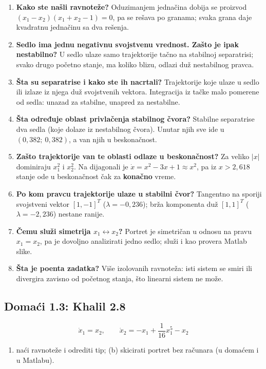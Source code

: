 \documentclass[11pt,a4paper,parskip=half,headsepline,numbers=noenddot]{scrartcl}
\begin{document}
\begin{enumerate}
\def\labelenumi{\arabic{enumi}.}
\item \textbf{Kako ste našli ravnoteže?} Oduzimanjem jednačina dobija se proizvod \((x_1 - x_2)(x_1 + x_2 - 1) = 0\), pa se rešava po granama; svaka grana daje kvadratnu jednačinu sa dva rešenja.
\item \textbf{Sedlo ima jednu negativnu svojstvenu vrednost. Zašto je ipak nestabilno?} U sedlo ulaze samo trajektorije tačno na stabilnoj separatrisi; svako drugo početno stanje, ma koliko blizu, odlazi duž nestabilnog pravca.
\item \textbf{Šta su separatrise i kako ste ih nacrtali?} Trajektorije koje ulaze u sedlo ili izlaze iz njega duž svojstvenih vektora. Integracija iz tačke malo pomerene od sedla: unazad za stabilne, unapred za nestabilne.
\item \textbf{Šta određuje oblast privlačenja stabilnog čvora?} Stabilne separatrise dva sedla (koje dolaze iz nestabilnog čvora). Unutar njih sve ide u \((0{,}382;\ 0{,}382)\), a van njih u beskonačnost.
\item \textbf{Zašto trajektorije van te oblasti odlaze u beskonačnost?} Za veliko \(|x|\) dominiraju \(x_1^2\) i \(x_2^2\). Na dijagonali je \(\dot x = x^2 - 3x + 1 \approx x^2\), pa iz \(x > 2{,}618\) stanje ode u beskonačnost čak za \textbf{konačno} vreme.
\item \textbf{Po kom pravcu trajektorije ulaze u stabilni čvor?} Tangentno na sporiji svojstveni vektor \([1, -1]^T\) (\(\lambda = -0{,}236\)); brža komponenta duž \([1, 1]^T\) (\(\lambda = -2{,}236\)) nestane ranije.
\item \textbf{Čemu služi simetrija \(x_1 \leftrightarrow x_2\)?} Portret je simetričan u odnosu na pravu \(x_1 = x_2\), pa je dovoljno analizirati jedno sedlo; služi i kao provera Matlab slike.
\item \textbf{Šta je poenta zadatka?} Više izolovanih ravnoteža: isti sistem se smiri ili divergira zavisno od početnog stanja, što linearni sistem ne može.
\end{enumerate}

\subsection{Domaći 1.3: Khalil 2.8}

\[\dot x_1 = x_2, \qquad \dot x_2 = -x_1 + \frac{1}{16}x_1^5 - x_2\]

\begin{enumerate}
\def\labelenumi{(\alph{enumi})}
\item naći ravnoteže i odrediti tip; (b) skicirati portret bez računara (u domaćem i u Matlabu).
\end{enumerate}
\end{document}
